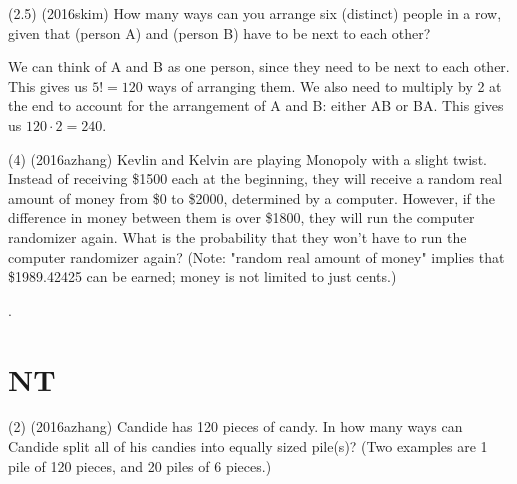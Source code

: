 \documentclass{article}
\begin{document}
\begin{problem}
\item (2.5) (2016skim) How many ways can you arrange six (distinct) people in a row, given that (person A) and (person B) have to be next to each other?
\end{problem}

\begin{answer}
\end{answer}

\begin{solution}
We can think of A and B as one person, since they need to be next to each other. This gives us $5! = 120$ ways of arranging them. We also need to multiply by 2 at the end to account for the arrangement of A and B: either AB or BA. This gives us $120\cdot2 = 240$.
\end{solution}


\begin{problem}

(4) (2016azhang) Kevlin and Kelvin are playing Monopoly with a slight twist. Instead of receiving \$1500 each at the beginning, they will receive a random real amount of money from \$0 to \$2000, determined by a computer. However, if the difference in money between them is over \$1800, they will run the computer randomizer again. What is the probability that they won't have to run the computer randomizer again? (Note: "random real amount of money" implies that \$1989.42425 can be earned; money is not limited to just cents.)
\end{problem}

\begin{answer}
.
\end{answer}

\begin{solution}
\end{solution}

\section{NT}
\begin{problem}
(2) (2016azhang) Candide has 120 pieces of candy. In how many ways can Candide split all of his candies into equally sized pile(s)? (Two examples are 1 pile of 120 pieces, and 20 piles of 6 pieces.)
\end{problem}
\end{document}

